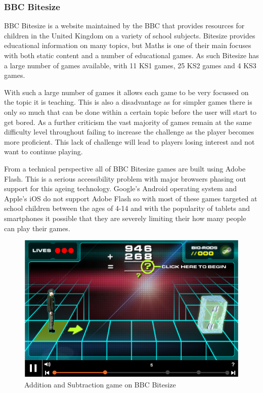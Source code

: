 \documentclass[12pt,a4paper]{report}
\begin{document}
\subsubsection{BBC Bitesize}
BBC Bitesize is a website maintained by the BBC that provides resources for children in the United Kingdom on a variety of school subjects. Bitesize provides educational information on many topics, but Maths is one of their main focuses with both static content and a number of educational games. As such Bitesize has a large number of games available, with 11 KS1 games, 25 KS2 games and 4 KS3 games.

With such a large number of games it allows each game to be very focussed on the topic it is teaching. This is also a disadvantage as for simpler games there is only so much that can be done within a certain topic before the user will start to get bored. As a further criticism the vast majority of games remain at the same difficulty level throughout failing to increase the challenge as the player becomes more proficient. This lack of challenge will lead to players losing interest and not want to continue playing. 

From a technical perspective all of BBC Bitesize games are built using Adobe Flash. This is a serious accessibility problem with major browsers phasing out support for this ageing technology. Google's Android operating system and Apple's iOS do not support Adobe Flash  so with most of these games targeted at school children between the ages of 4-14 and with the popularity of tablets and smartphones it possible that they are severely limiting their how many people can play their games.

\begin{figure}[!tbp]
  \centering
  \begin{minipage}[b]{1\textwidth}
    \includegraphics[width=\textwidth]{BBCBitesize}
    \caption{Addition and Subtraction game on BBC Bitesize}
  \end{minipage}
\end{figure}
\FloatBarrier
\end{document}
